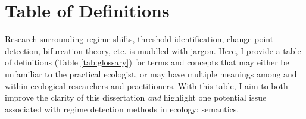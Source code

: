 \documentclass[12pt,twoside,openany]{reedthesis}
\begin{document}
\hypertarget{definitions}{%
\chapter*{Table of Definitions}\label{definitions}}

Research surrounding regime shifts, threshold identification, change-point detection, bifurcation theory, etc. is muddled with jargon. Here, I provide a table of definitions (Table \ref{tab:glossary}) for terms and concepts that may either be unfamiliar to the practical ecologist, or may have multiple meanings among and within ecological researchers and practitioners. With this table, I aim to both improve the clarity of this dissertation \emph{and} highlight one potential issue associated with regime detection methods in ecology: semantics.
\end{document}
